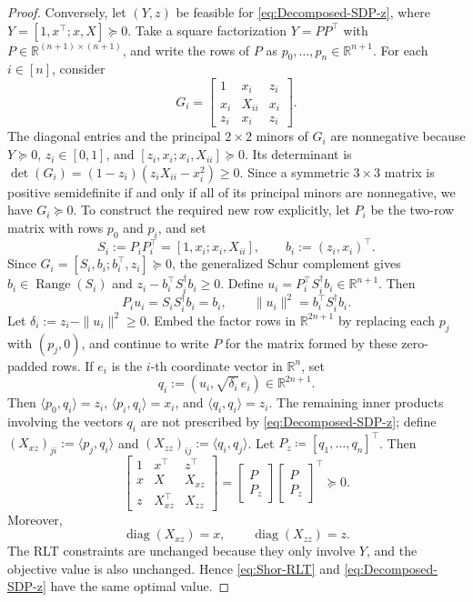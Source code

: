 \documentclass[10pt,a4paper]{amsart}
\def\R{\mathbb{R}}
\def\Range{{\operatorname{Range}}}
\DeclareMathOperator{\diag}{diag}
\begin{document}
\begin{proof}
Conversely, let $(Y,z)$ be feasible for \eqref{eq:Decomposed-SDP-z}, where $Y=[1,x^\top;x,X]\succeq0$. Take a square factorization $Y=PP^\top$ with $P\in\R^{(n+1)\times(n+1)}$, and write the rows of $P$ as $p_0,\ldots,p_n\in\R^{n+1}$. For each $i\in[n]$, consider
\[
G_i=
\begin{bmatrix}
1&x_i&z_i\\
x_i&X_{ii}&x_i\\
z_i&x_i&z_i
\end{bmatrix}.
\]
The diagonal entries and the principal $2\times2$ minors of $G_i$ are nonnegative because $Y\succeq0$, $z_i\in[0,1]$, and $[z_i,x_i;x_i,X_{ii}]\succeq0$. Its determinant is $\det(G_i)=(1-z_i)(z_iX_{ii}-x_i^2)\ge0$. Since a symmetric $3\times3$ matrix is positive semidefinite if and only if all of its principal minors are nonnegative, we have $G_i\succeq0$.
To construct the required new row explicitly, let $P_i$ be the two-row matrix with rows $p_0$ and $p_i$, and set
\[
S_i:=P_iP_i^\top=[1,x_i;x_i,X_{ii}],
\qquad
b_i:=(z_i,x_i)^\top .
\]
Since $G_i=[S_i,b_i;b_i^\top,z_i]\succeq0$, the generalized Schur complement gives $b_i\in\Range(S_i)$ and $z_i-b_i^\top S_i^\dagger b_i\ge0$. Define $u_i=P_i^\top S_i^\dagger b_i\in\R^{n+1}$. Then
\[
P_i u_i=S_iS_i^\dagger b_i=b_i,
\qquad
\|u_i\|^2=b_i^\top S_i^\dagger b_i .
\]
Let $\delta_i:=z_i-\|u_i\|^2\ge0$. Embed the factor rows in $\R^{2n+1}$ by replacing each $p_j$ with $(p_j,0)$, and continue to write $P$ for the matrix formed by these zero-padded rows. If $e_i$ is the $i$-th coordinate vector in $\R^n$, set
\[
q_i:=(u_i,\sqrt{\delta_i}\,e_i)\in\R^{2n+1}.
\]
Then $\langle p_0,q_i\rangle=z_i$, $\langle p_i,q_i\rangle=x_i$, and $\langle q_i,q_i\rangle=z_i$. The remaining inner products involving the vectors $q_i$ are not prescribed by \eqref{eq:Decomposed-SDP-z}; define $(X_{xz})_{ji}:=\langle p_j,q_i\rangle$ and $(X_{zz})_{ij}:=\langle q_i,q_j\rangle$.
Let $P_z\coloneq[q_1,\ldots,q_n]^\top$. Then
\[
\begin{bmatrix}
1&x^\top&z^\top\\
x&X&X_{xz}\\
z&X_{xz}^\top&X_{zz}
\end{bmatrix}
=
\begin{bmatrix}
P\\
P_z
\end{bmatrix}
\begin{bmatrix}
P\\
P_z
\end{bmatrix}^{\top}
\succeq0.
\]
Moreover,
\[
\diag(X_{xz})=x,\qquad \diag(X_{zz})=z.
\]
The RLT constraints are unchanged because they only involve $Y$, and the objective value is also unchanged. Hence \eqref{eq:Shor-RLT} and \eqref{eq:Decomposed-SDP-z} have the same optimal value. 


\end{proof}
\end{document}
